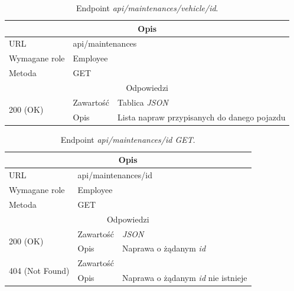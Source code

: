 \documentclass[eng,printmode,openany]{mgr}
\begin{document}
	\begin{table}[H]
		\caption{Endpoint \textit{api/maintenances/vehicle/id}.}
		\begin{tabularx}{\textwidth}{|l|l|X|}
			\hline
			\multicolumn{3}{|c|}{Opis}
			\\ \hline
			URL                         & \multicolumn{2}{l|}{api/maintenances}
			\\ \hline
			Wymagane role               & \multicolumn{2}{l|}{Employee}
			\\ \hline
			Metoda                      & \multicolumn{2}{l|}{GET}
			\\ \hline
			\multicolumn{3}{|c|}{ Odpowiedzi}
			\\ \hline
			\multirow{2}{*}{200 (OK)}   & Zawartość         & Tablica \textit{JSON}
			\\ \cline{2-3}              & Opis         	    & Lista napraw przypisanych do danego pojazdu
			\\ \hline
		\end{tabularx}
	\end{table}
	
	\begin{table}[H]
		\caption{Endpoint \textit{api/maintenances/id GET}.}
		\begin{tabularx}{\textwidth}{|l|l|X|}
			\hline
			\multicolumn{3}{|c|}{Opis}
			\\ \hline
			URL                         & \multicolumn{2}{l|}{api/maintenances/id}
			\\ \hline
			Wymagane role               & \multicolumn{2}{l|}{Employee}
			\\ \hline
			Metoda                      & \multicolumn{2}{l|}{GET}
			\\ \hline
			\multicolumn{3}{|c|}{Odpowiedzi}
			\\ \hline
			\multirow{2}{*}{200 (OK)} 	        & Zawartość   	& \textit{JSON}
			\\ \cline{2-3}                      & Opis         	& Naprawa o żądanym \textit{id}
			\\ \hline
			\multirow{2}{*}{404 (Not Found)} 	& Zawartość     & 
			\\ \cline{2-3}                      & Opis          & Naprawa o żądanym \textit{id} nie istnieje
			\\ \hline
		\end{tabularx}
	\end{table}
	
\end{document}
